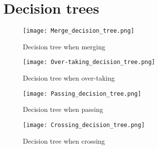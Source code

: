 \chapter{Decision trees}
\label{app:decision-trees}

\begin{figure}[hp]
	\centering
	\texttt{[image: Merge\_decision\_tree.png]}
	\caption{Decision tree when merging}
	\label{fig:Merge_decision_tree}
\end{figure}


\begin{figure}[hp]
	\centering
	\texttt{[image: Over-taking\_decision\_tree.png]}
	\caption{Decision tree when over-taking}
	\label{fig:Over-taking_decision_tree}
\end{figure}


\begin{figure}[hp]
	\centering
	\texttt{[image: Passing\_decision\_tree.png]}
	\caption{Decision tree when passing}
	\label{fig:Passing_decision_tree}
\end{figure}

\begin{figure}[hp]
	\centering
	\texttt{[image: Crossing\_decision\_tree.png]}
	\caption{Decision tree when crossing}
	\label{fig:Crossing_decision_tree}
\end{figure}